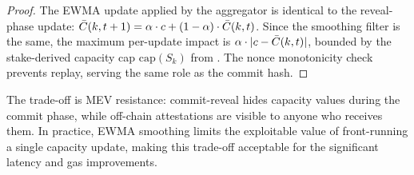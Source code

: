 \begin{proof}
The EWMA update applied by the aggregator is identical to the reveal-phase
update: $\bar{C}(k, t+1) = \alpha \cdot c + (1-\alpha) \cdot \bar{C}(k, t)$.
Since the smoothing filter is the same, the maximum per-update impact is
$\alpha \cdot |c - \bar{C}(k, t)|$, bounded by the stake-derived capacity
cap $\text{cap}(S_k)$ from . The nonce monotonicity check
prevents replay, serving the same role as the commit hash.
\end{proof}

The trade-off is MEV resistance: commit-reveal hides capacity values during
the commit phase, while off-chain attestations are visible to anyone who
receives them. In practice, EWMA smoothing limits the exploitable value of
front-running a single capacity update, making this trade-off acceptable
for the significant latency and gas improvements.
